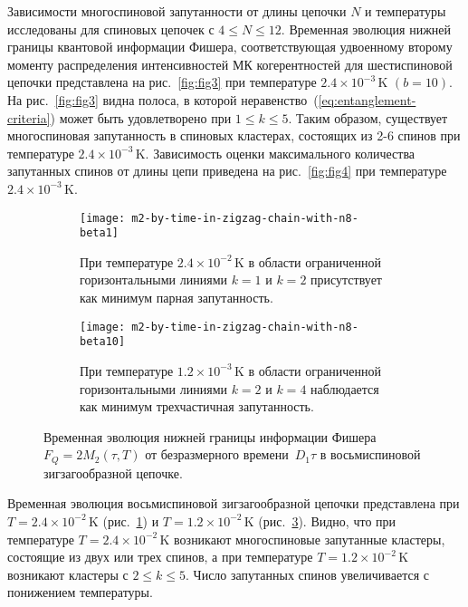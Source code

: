 Зависимости многоспиновой запутанности от длины цепочки $N$ и температуры исследованы для спиновых цепочек с $4\leqslant N \leqslant 12$.
Временная эволюция нижней границы квантовой информации Фишера,
соответствующая  удвоенному второму моменту распределения интенсивностей МК когерентностей для шестиспиновой цепочки представлена на рис.~\ref{fig:fig3} при температуре $2.4\times 10^{-3}\,\mbox{K}$ $(b=10)$.
На рис.~\ref{fig:fig3} видна полоса,
в которой неравенство~(\ref{eq:entanglement-criteria}) может быть удовлетворено при $1\leqslant k \leqslant 5$.
Таким образом, существует многоспиновая запутанность в спиновых кластерах, состоящих из 2-6 спинов при температуре $2.4\times 10^{-3}\,\mbox{K}$.
Зависимость оценки максимального количества запутанных спинов от длины цепи приведена на рис.~\ref{fig:fig4} при температуре $2.4\times 10^{-3}\,\mbox{K}$.

\begin{figure}[H]
  \begin{subfigure}[t]{0.49\textwidth}
    \texttt{[image: m2-by-time-in-zigzag-chain-with-n8-beta1]}				
    \caption{
      При температуре $2.4\times 10^{-2}\,\mbox{K}$
      в области ограниченной горизонтальными линиями $k=1$ и $k=2$
      присутствует как минимум парная запутанность.
    }
    \label{fig:fig5}
  \end{subfigure}
  \hfill
  \begin{subfigure}[t]{0.49\textwidth}
    \texttt{[image: m2-by-time-in-zigzag-chain-with-n8-beta10]}				
    \caption{
       При температуре $1.2\times 10^{-3}\,\mbox{K}$
       в области ограниченной горизонтальными линиями $k=2$ и $k=4$
       наблюдается как минимум трехчастичная запутанность.
    }
    \label{fig:fig6}
  \end{subfigure}
  \caption{
    Временная эволюция нижней границы информации Фишера~$F_Q=2M_2(\tau, T)$
    от безразмерного времени~$D_1\tau$
    в восьмиспиновой зигзагообразной цепочке.
  }
\end{figure}

Временная эволюция восьмиспиновой зигзагообразной цепочки представлена при $T=2.4\times 10^{-2}\,\mbox{K}$ (рис.~\ref{fig:fig5}) и $T=1.2\times 10^{-2}\,\mbox{K}$ (рис.~\ref{fig:fig6}).  Видно, что при температуре $T=2.4\times 10^{-2}\,\mbox{K}$ возникают многоспиновые запутанные кластеры, состоящие из двух или трех спинов, а при температуре $T=1.2\times 10^{-2}\,\mbox{K}$ возникают кластеры с $2\leqslant k \leqslant 5$.
Число запутанных спинов увеличивается с понижением температуры.

